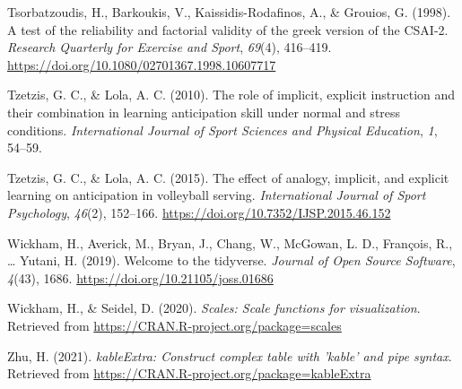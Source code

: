 \documentclass[
  english,
  man, donotrepeattitle,floatsintext]{apa7}
\newlength{\cslhangindent}
\newlength{\cslentryspacingunit} %
\newenvironment{CSLReferences}[2] %
 {%
  \setlength{\parindent}{0pt}
  \ifodd #1
  \let\oldpar\par
  \def\par{\hangindent=\cslhangindent\oldpar}
  \fi
  \setlength{\parskip}{#2\cslentryspacingunit}
 }%
 {}
\begin{document}
\begin{CSLReferences}{1}{0}
\leavevmode{}%
Tsorbatzoudis, H., Barkoukis, V., Kaissidis-Rodafinos, A., \& Grouios, G. (1998). A test of the reliability and factorial validity of the greek version of the CSAI-2. \emph{Research Quarterly for Exercise and Sport}, \emph{69}(4), 416--419. \url{https://doi.org/10.1080/02701367.1998.10607717}

\leavevmode{}%
Tzetzis, G. C., \& Lola, A. C. (2010). The role of implicit, explicit instruction and their combination in learning anticipation skill under normal and stress conditions. \emph{International Journal of Sport Sciences and Physical Education}, \emph{1}, 54--59.

\leavevmode{}%
Tzetzis, G. C., \& Lola, A. C. (2015). The effect of analogy, implicit, and explicit learning on anticipation in volleyball serving. \emph{International Journal of Sport Psychology}, \emph{46}(2), 152--166. \url{https://doi.org/10.7352/IJSP.2015.46.152}

\leavevmode{}%
Wickham, H., Averick, M., Bryan, J., Chang, W., McGowan, L. D., François, R., \ldots{} Yutani, H. (2019). Welcome to the {tidyverse}. \emph{Journal of Open Source Software}, \emph{4}(43), 1686. \url{https://doi.org/10.21105/joss.01686}

\leavevmode{}%
Wickham, H., \& Seidel, D. (2020). \emph{Scales: Scale functions for visualization}. Retrieved from \url{https://CRAN.R-project.org/package=scales}

\leavevmode{}%
Zhu, H. (2021). \emph{kableExtra: Construct complex table with 'kable' and pipe syntax}. Retrieved from \url{https://CRAN.R-project.org/package=kableExtra}

\end{CSLReferences}
\end{document}
